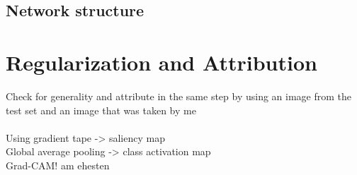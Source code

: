 \documentclass{article}
\begin{document}
\begin{multicols}{2}
\subsection{Network structure}


\section{Regularization and Attribution}
Check for generality and attribute in the same step by using an image from the test set and an image that was taken by me\\
\\
Using gradient tape -> saliency map\\
Global average pooling -> class activation map\\
Grad-CAM! am ehesten

\end{multicols}
\end{document}
